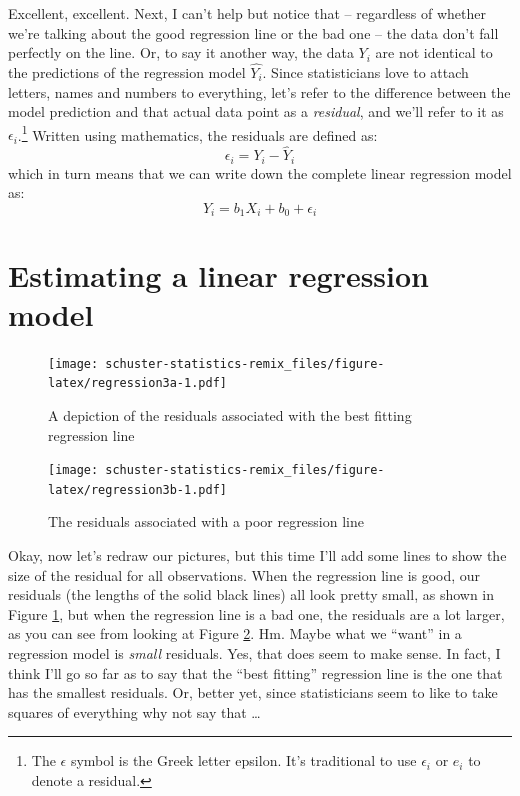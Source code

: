 \documentclass[
]{book}
\begin{document}
Excellent, excellent. Next, I can't help but notice that -- regardless of whether we're talking about the good regression line or the bad one -- the data don't fall perfectly on the line. Or, to say it another way, the data \(Y_i\) are not identical to the predictions of the regression model \(\hat{Y_i}\). Since statisticians love to attach letters, names and numbers to everything, let's refer to the difference between the model prediction and that actual data point as a \emph{residual}, and we'll refer to it as \(\epsilon_i\).\footnote{The \(\epsilon\) symbol is the Greek letter epsilon. It's traditional to use \(\epsilon_i\) or \(e_i\) to denote a residual.} Written using mathematics, the residuals are defined as:
\[
\epsilon_i = Y_i - \hat{Y}_i
\]
which in turn means that we can write down the complete linear regression model as:
\[
Y_i = b_1 X_i + b_0 + \epsilon_i
\]

\hypertarget{regressionestimation}{%
\section{Estimating a linear regression model}\label{regressionestimation}}

\begin{figure}
\centering
\texttt{[image: schuster-statistics-remix\_files/figure-latex/regression3a-1.pdf]}
\caption{\label{fig:regression3a}A depiction of the residuals associated with the best fitting regression line}
\end{figure}

\begin{figure}
\centering
\texttt{[image: schuster-statistics-remix\_files/figure-latex/regression3b-1.pdf]}
\caption{\label{fig:regression3b}The residuals associated with a poor regression line}
\end{figure}

Okay, now let's redraw our pictures, but this time I'll add some lines to show the size of the residual for all observations. When the regression line is good, our residuals (the lengths of the solid black lines) all look pretty small, as shown in Figure \ref{fig:regression3a}, but when the regression line is a bad one, the residuals are a lot larger, as you can see from looking at Figure \ref{fig:regression3b}. Hm. Maybe what we ``want'' in a regression model is \emph{small} residuals. Yes, that does seem to make sense. In fact, I think I'll go so far as to say that the ``best fitting'' regression line is the one that has the smallest residuals. Or, better yet, since statisticians seem to like to take squares of everything why not say that \ldots{}
\end{document}
